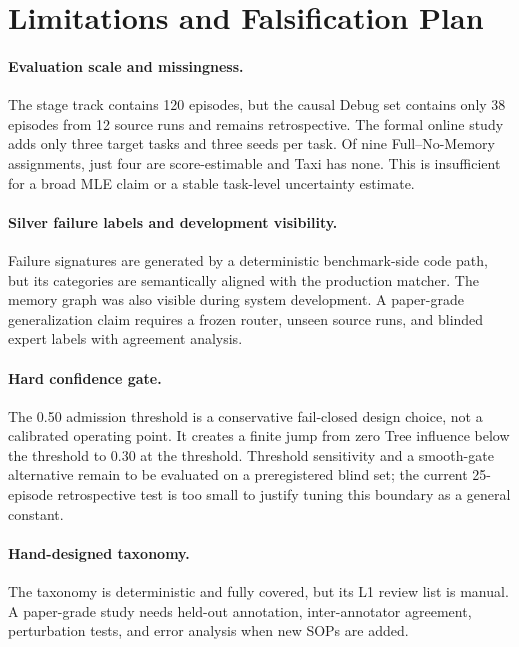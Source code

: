 \documentclass{article}
\begin{document}
\section{Limitations and Falsification Plan}

\paragraph{Evaluation scale and missingness.}
The stage track contains 120 episodes, but the causal Debug set contains only 38
episodes from 12 source runs and remains retrospective.  The formal online study
adds only three target tasks and three seeds per task.  Of nine Full--No-Memory
assignments, just four are score-estimable and Taxi has none.  This is
insufficient for a broad MLE claim or a stable task-level uncertainty estimate.

\paragraph{Silver failure labels and development visibility.}
Failure signatures are generated by a deterministic benchmark-side code path,
but its categories are semantically aligned with the production matcher.  The
memory graph was also visible during system development.  A paper-grade
generalization claim requires a frozen router, unseen source runs, and blinded
expert labels with agreement analysis.

\paragraph{Hard confidence gate.}
The 0.50 admission threshold is a conservative fail-closed design choice, not a
calibrated operating point.  It creates a finite jump from zero Tree influence
below the threshold to 0.30 at the threshold.  Threshold sensitivity and a
smooth-gate alternative remain to be evaluated on a preregistered blind set;
the current 25-episode retrospective test is too small to justify tuning this
boundary as a general constant.

\paragraph{Hand-designed taxonomy.}
The taxonomy is deterministic and fully covered, but its L1 review list is
manual.  A paper-grade study needs held-out annotation, inter-annotator
agreement, perturbation tests, and error analysis when new SOPs are added.
\end{document}
